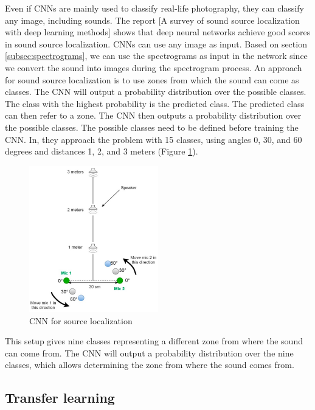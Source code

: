Even if CNNs are mainly used to classify real-life photography, they can classify any image, including sounds. The report [A survey of sound source localization with deep learning methods]\cite{Grumiaux_2022} shows that deep neural networks achieve good scores in sound source localization. CNNs can use any image as input. Based on section \ref*{subsec:spectrograms}, we can use the spectrograms as input in the network since we convert the sound into images during the spectrogram process. An approach for sound source localization is to use zones from which the sound can come as classes. The CNN will output a probability distribution over the possible classes. The class with the highest probability is the predicted class. The predicted class can then refer to a zone. The CNN then outputs a probability distribution over the possible classes. The possible classes need to be defined before training the CNN. In\cite{s20010172}, they approach the problem with 15 classes, using angles 0, 30, and 60 degrees and distances 1, 2, and 3 meters (Figure \ref*{fig:Yiwere_classes}).

\begin{figure}[H]
    \centering
    \includegraphics[width=0.5\textwidth]{../Images/Yiwere_classes.png}
    \caption{CNN for source localization}
    \label{fig:Yiwere_classes}
\end{figure}

This setup gives nine classes representing a different zone from where the sound can come from. The CNN will output a probability distribution over the nine classes, which allows determining the zone from where the sound comes from.

\subsection{Transfer learning}


